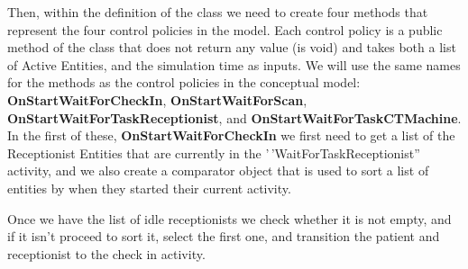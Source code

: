 \documentclass[
  10pt,
  a4paperpaper,
  DIV=11,
  numbers=noendperiod,
  oneside]{scrreprt}
\begin{document}
Then, within the definition of the class we need to create four methods
that represent the four control policies in the model. Each control
policy is a public method of the class that does not return any value
(is void) and takes both a list of Active Entities, and the simulation
time as inputs. We will use the same names for the methods as the
control policies in the conceptual model:
\textbf{OnStartWaitForCheckIn}, \textbf{OnStartWaitForScan},
\textbf{OnStartWaitForTaskReceptionist}, and
\textbf{OnStartWaitForTaskCTMachine}. In the first of these,
\textbf{OnStartWaitForCheckIn} we first need to get a list of the
Receptionist Entities that are currently in the
'\,'WaitForTaskReceptionist'' activity, and we also create a comparator
object that is used to sort a list of entities by when they started
their current activity.

Once we have the list of idle receptionists we check whether it is not
empty, and if it isn't proceed to sort it, select the first one, and
transition the patient and receptionist to the check in activity.
\end{document}
